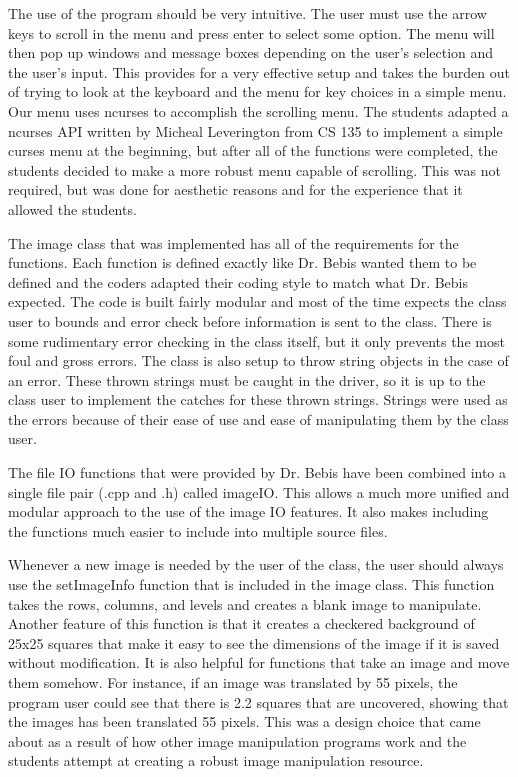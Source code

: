 \documentclass[pdftex, 11pt]{article}
\begin{document}
The use of the program should be very intuitive. The user must use the arrow keys to scroll in the menu and press enter
to select some option. The menu will then pop up windows and message boxes depending on the user's selection and the
user's input. This provides for a very effective setup and takes the burden out of trying to look at the keyboard and
the menu for key choices in a simple menu. Our menu uses ncurses to accomplish the scrolling menu. The students adapted
a ncurses API written by Micheal Leverington from CS 135 to implement a simple curses menu at the beginning, but after
all of the functions were completed, the students decided to make a more robust menu capable of scrolling. This was not
required, but was done for aesthetic reasons and for the experience that it allowed the students.

The image class that was implemented has all of the requirements for the functions. Each function is defined exactly
like Dr. Bebis wanted them to be defined and the coders adapted their coding style to match what Dr. Bebis expected. The
code is built fairly modular and most of the time expects the class user to bounds and error check before information is
sent to the class. There is some rudimentary error checking in the class itself, but it only prevents the most foul and
gross errors. The class is also setup to throw string objects in the case of an error. These thrown strings must be
caught in the driver, so it is up to the class user to implement the catches for these thrown strings. Strings were used
as the errors because of their ease of use and ease of manipulating them by the class user. 

The file IO functions that were provided by Dr. Bebis have been combined into a single file pair (.cpp and .h) called
imageIO. This allows a much more unified and modular approach to the use of the image IO features. It also makes
including the functions much easier to include into multiple source files.

Whenever a new image is needed by the user of the class, the user should always use the setImageInfo function that is
included in the image class. This function takes the rows, columns, and levels and creates a blank image to manipulate.
Another feature of this function is that it creates a checkered background of 25x25 squares that make it easy to see the
dimensions of the image if it is saved without modification. It is also helpful for functions that take an image and
move them somehow. For instance, if an image was translated by 55 pixels, the program user could see that there is 2.2
squares that are uncovered, showing that the images has been translated 55 pixels. This was a design choice that came
about as a result of how other image manipulation programs work and the students attempt at creating a robust image
manipulation resource.
\end{document}
